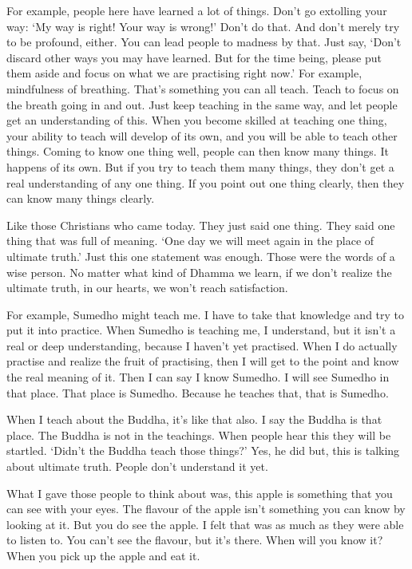 For example, people here have learned a lot of things. Don't go extolling your way: `My way is right! Your way is wrong!' Don't do that. And don't merely try to be profound, either. You can lead people to madness by that. Just say, `Don't discard other ways you may have learned. But for the time being, please put them aside and focus on what we are practising right now.' For example, mindfulness of breathing. That's something you can all teach. Teach to focus on the breath going in and out. Just keep teaching in the same way, and let people get an understanding of this. When you become skilled at teaching one thing, your ability to teach will develop of its own, and you will be able to teach other things. Coming to know one thing well, people can then know many things. It happens of its own. But if you try to teach them many things, they don't get a real understanding of any one thing. If you point out one thing clearly, then they can know many things clearly.

Like those Christians who came today. They just said one thing. They said one thing that was full of meaning. `One day we will meet again in the place of ultimate truth.' Just this one statement was enough. Those were the words of a wise person. No matter what kind of Dhamma we learn, if we don't realize the ultimate truth,  in our hearts, we won't reach satisfaction.

For example, Sumedho might teach me. I have to take that knowledge and try to put it into practice. When Sumedho is teaching me, I understand, but it isn't a real or deep understanding, because I haven't yet practised. When I do actually practise and realize the fruit of practising, then I will get to the point and know the real meaning of it. Then I can say I know Sumedho. I will see Sumedho in that place. That place is Sumedho. Because he teaches that, that is Sumedho.

When I teach about the Buddha, it's like that also. I say the Buddha is that place. The Buddha is not in the teachings. When people hear this they will be startled. `Didn't the Buddha teach those things?' Yes, he did but, this is talking about ultimate truth. People don't understand it yet.

What I gave those people to think about was, this apple is something that you can see with your eyes. The flavour of the apple isn't something you can know by looking at it. But you do see the apple. I felt that was as much as they were able to listen to. You can't see the flavour, but it's there. When will you know it? When you pick up the apple and eat it.

